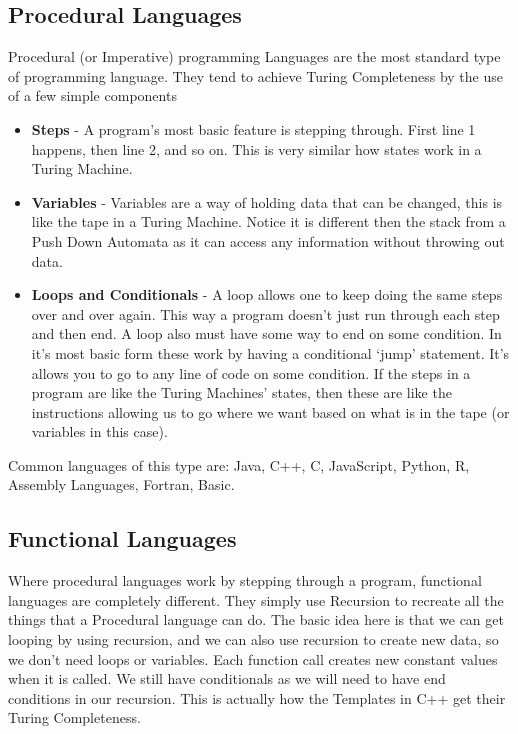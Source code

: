 \documentclass{article}
\begin{document}
	\subsection{Procedural Languages}
	Procedural (or Imperative) programming Languages are the most standard type of programming language. They tend to achieve Turing Completeness by the use of a few simple components
	
	\begin{itemize}
		\item \textbf{Steps} - A program's most basic feature is stepping through. First line 1 happens, then line 2, and so on. This is very similar how states work in a Turing Machine.
		\item \textbf{Variables} - Variables are a way of holding data that can be changed, this is like the tape in a Turing Machine. Notice it is different then the stack from a Push Down Automata as it can access any information without throwing out data.
		\item \textbf{Loops and Conditionals} - A loop allows one to keep doing the same steps over and over again. This way a program doesn't just run through each step and then end. A loop also must have some way to end on some condition. In it's most basic form these work by having a conditional `jump' statement. It's allows you to go to any line of code on some condition. If the steps in a program are like the Turing Machines' states, then these are like the instructions allowing us to go where we want based on what is in the tape (or variables in this case).
	\end{itemize}
	
	Common languages of this type are: Java, C++, C, JavaScript, Python, R, Assembly Languages, Fortran, Basic.
	
	
	\subsection{Functional Languages}
	Where procedural languages work by stepping through a program, functional languages are completely different. They simply use Recursion to recreate all the things that a Procedural language can do. The basic idea here is that we can get looping by using recursion, and we can also use recursion to create new data, so we don't need loops or variables. Each function call creates new constant values when it is called. We still have conditionals as we will need to have end conditions in our recursion. This is actually how the Templates in C++ get their Turing Completeness.
	
\end{document}
